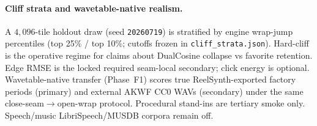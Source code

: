 \paragraph{Cliff strata and wavetable-native realism.}
A $4{,}096$-tile holdout draw (seed \texttt{20260719}) is stratified by engine wrap-jump percentiles (top 25\% / top 10\%; cutoffs frozen in \texttt{cliff\_strata.json}).
Hard-cliff is the operative regime for claims about DualCosine collapse vs favorite retention.
Edge RMSE is the locked required seam-local secondary; click energy is optional.
Wavetable-native transfer (Phase~F1) scores true ReelSynth-exported factory periods (primary) and external AKWF CC0 WAVs (secondary) under the same close-seam$\to$open-wrap protocol.
Procedural stand-ins are tertiary smoke only.
Speech/music LibriSpeech/MUSDB corpora remain off.
